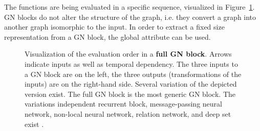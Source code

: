 The functions are being evaluated in a specific sequence, visualized in Figure~\ref{fig:fullgraphblock}. GN blocks do not alter the structure of the graph, i.e. they convert a graph into another graph isomorphic to the input. In order to extract a fixed size representation from a GN block, the global attribute can be used.

\begin{figure}
    \centering

    \caption[Full GN block]{Visualization of the evaluation order in a \textbf{full GN block}. Arrows indicate inputs as well as temporal dependency. The three inputs to a GN block are on the left, the three outputs (transformations of the inputs) are on the right-hand side. Several variation of the depicted version exist. The full GN block is the most generic GN block. The variations independent recurrent block, message-passing neural network, non-local neural network, relation network, and deep set exist \cite{deepmind:graphnets}.}
    \label{fig:fullgraphblock}
\end{figure}


